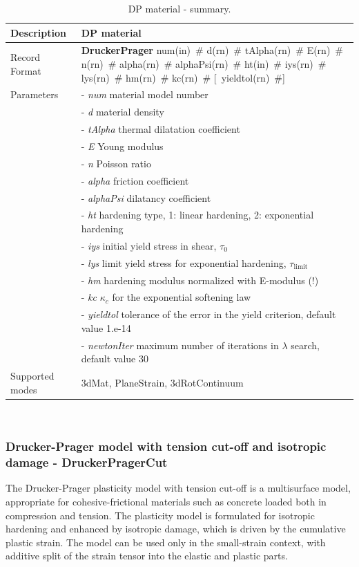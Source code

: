 \documentclass[a4paper]{article}
\newcommand{\descitem}[1]{{\noindent \bf #1}}
\newcommand{\elemparam}[2]{{{#1\tiny (#2)}~\#}}
\newcommand{\optelemparam}[2]{[{~\elemparam{#1}{#2}}]}
\newcommand{\param}[1]{{\it #1}}
\newenvironment{mmt}{\begin{tabular}{|l|p{9cm}|}}{\end{tabular}\\}
\newenvironment{mmt}{\begin{tabular}{|l|l|}}{\end{tabular}\\}
\begin{document}
\begin{table}[!htb]
\begin{mmt}
\hline
Description & DP material\\
\hline
Record Format & \descitem{DruckerPrager} \elemparam{num}{in}
\elemparam{d}{rn} \elemparam{tAlpha}{rn} \elemparam{E}{rn} \elemparam{n}{rn}
\elemparam{alpha}{rn} \elemparam{alphaPsi}{rn} \elemparam{ht}{in}
\elemparam{iys}{rn} \elemparam{lys}{rn} \elemparam{hm}{rn} \elemparam{kc}{rn} \optelemparam{yieldtol}{rn} \\
Parameters &- \param{num} material model number\\
&- \param{d} material density\\
&- \param{tAlpha} thermal dilatation coefficient\\
&- \param{E} Young modulus\\
&- \param{n} Poisson ratio\\
&- \param{alpha} friction coefficient\\
&- \param{alphaPsi}  dilatancy coefficient\\
&- \param{ht} hardening type, 1: linear hardening, 2: exponential
hardening\\
&- \param{iys} initial yield stress in shear, $\tau_0$\\
&- \param{lys} limit yield stress for exponential hardening, $\tau_{\mathrm{limit}}$\\
&- \param{hm} hardening modulus normalized with E-modulus (!)\\
&- \param{kc} $\kappa_c$ for the exponential softening law\\
&- \param{yieldtol} tolerance of the error in the yield criterion, default value
1.e-14\\
&- \param{newtonIter} maximum number of iterations in $\lambda$ search, default value 30\\
Supported modes& 3dMat, PlaneStrain, 3dRotContinuum\\
\hline
\end{mmt}
\caption{DP material - summary.}
\label{DP_table}
\end{table}

\subsubsection{Drucker-Prager model with tension cut-off and isotropic damage - DruckerPragerCut}
\label{DPCutmodel}
The Drucker-Prager plasticity model with tension cut-off is a multisurface model, appropriate for cohesive-frictional 
materials such as concrete loaded both in compression and tension. The plasticity model is formulated for isotropic 
hardening and enhanced by isotropic damage, which is driven by the cumulative plastic strain. The model can be used 
only in the small-strain context, with additive split of the strain tensor into the elastic and plastic parts.
\end{document}
